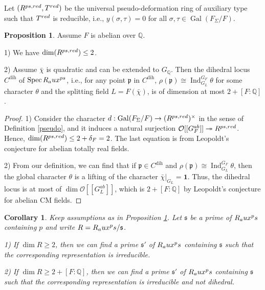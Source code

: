 \documentclass[12pt]{amsart}
\theoremstyle{plain}
\newtheorem{cor}[thm]{Corollary}
\theoremstyle{definition}
\newtheorem{prop}[thm]{Proposition}
\theoremstyle{remark}
\begin{document}
Let $(R^{\textnormal{ps,red}}, T^{\textnormal{red}})$ be the universal pseudo-deformation ring of auxiliary type such that $T^{\textnormal{red}}$ is reducible, i.e., $y(\sigma, \tau)=0$ for all $\sigma, \tau \in \operatorname{Gal}(F_{\Sigma}/F)$. 

\begin{prop}\label{red-pseudo} Assume $F$ is abelian over $\mathbb{Q}$.
	
	1) We have $\operatorname{dim}(R^{\textnormal{ps,red}}) \le 2$.
	
	2) Assume $\bar{\chi}$ is quadratic and can be extended to $G_{\mathbb{Q}}$. Then the dihedral locus $C^{\operatorname{dih}}$ of $\operatorname{Spec} R_\textnormal{aux}^{\textnormal{ps}}$, i.e., for any point $\mathfrak{p}$ in $C^{\operatorname{dih}}$, $\rho(\mathfrak{p}) \cong \operatorname{Ind}_{G_L}^{G_F} \theta$ for some character $\theta$ and the splitting field $L=F(\bar{\chi})$, is of dimension at most $2+[F: \mathbb{Q}]$. 
\end{prop}

\begin{proof}
	1) Consider the character $d : \operatorname{Gal}(F_{\Sigma}/F) \to (R^{\textnormal{ps,red}})^\times$ in the sense of Definition \ref{pseudo}, and it induces a natural surjection $\mathcal{O}[[G_{F}^{ab}]] \twoheadrightarrow R^{\textnormal{ps,red}}$. Hence, $\operatorname{dim}(R^{\textnormal{ps,red}}) \le 2+ \delta_F=2$. The last equation is from Leopoldt's conjecture for abelian totally real fields.
	
	2) From our definition, we can find that if $\mathfrak{p} \in C^{\operatorname{dih}}$ and $\rho(\mathfrak{p}) \cong \operatorname{Ind}_{G_L}^{G_F} \theta$, then the global character $\theta$ is a lifting of the character $\bar{\chi}|_{G_L}=\mathbf{1}$. Thus, the dihedral locus is at most of $\operatorname{dim} \mathcal{O}[[G_{L}^{ab}]]$, which is $2+[F: \mathbb{Q}]$ by Leopoldt's conjecture for abelian CM fields.
\end{proof}

\begin{cor}\label{red-one}
	Keep assumptions as in Proposition \ref{red-pseudo}. Let $\mathfrak{s}$ be a prime of $R_\textnormal{aux}^\textnormal{ps} $ containing $p$ and write $R=R_\textnormal{aux}^\textnormal{ps}/\mathfrak{s}$.
	
	1) If $\dim R \ge 2$, then we can find a prime $\mathfrak{s}'$ of $R_\textnormal{aux}^\textnormal{ps} $ containing $\mathfrak{s}$ such that the corresponding representation is irreducible.
	
	2) If $\dim R \ge 2+[F: \mathbb{Q}]$, then we can find a prime $\mathfrak{s}'$ of $R_\textnormal{aux}^\textnormal{ps} $ containing $\mathfrak{s}$ such that the corresponding representation is irreducible and not dihedral.
\end{cor}
\end{document}
